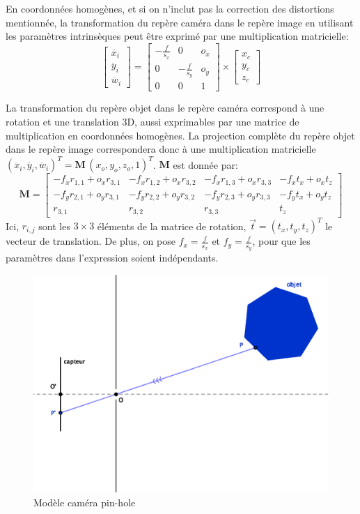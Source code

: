 \documentclass[a4paper,10pt]{scrreprt}
\begin{document}
En coordonnées homogènes, et si on n'inclut pas la correction des distortions mentionnée, la transformation du repère caméra dans le repère image en utilisant les paramètres intrinsèques peut être exprimé par une multiplication matricielle:
\begin{equation} \label{eq:cam_to_img}
	\begin{bmatrix}
		\ddot{x_i} \\
		\ddot{y_i} \\
		\ddot{w_i}
	\end{bmatrix} = \begin{bmatrix}
		-\frac{f}{s_x} & 0 & o_x \\
		0 & -\frac{f}{s_y} & o_y \\
		0 & 0 & 1
	\end{bmatrix} \times \begin{bmatrix}
		x_c \\
		y_c \\
		z_c
	\end{bmatrix}
\end{equation}

La transformation du repère objet dans le repère caméra correspond à une rotation et une translation 3D, aussi exprimables par une matrice de multiplication en coordonnées homogènes. La projection complète du repère objet dans le repère image correspondera donc à une multiplication matricielle $(\ddot{x_i}, \ddot{y_i}, \ddot{w_i})^T = \mathbf{M} \, (x_o, y_o, z_o, 1)^T$. $\mathbf{M}$ est donnée par:
\begin{equation*}
	\mathbf{M} = \begin{bmatrix}
		-f_x r_{1,1} + o_x r_{3,1} & -f_x r_{1,2} + o_x r_{3,2} & -f_x r_{1,3} + o_x r_{3,3} & -f_x t_x + o_x t_z \\
		-f_y r_{2,1} + o_y r_{3,1} & -f_y r_{2,2} + o_y r_{3,2} & -f_y r_{2,3} + o_y r_{3,3} & -f_y t_x + o_y t_z \\
		r_{3,1} & r_{3,2} & r_{3,3} & t_z
	\end{bmatrix}
\end{equation*}
Ici, $r_{i,j}$ sont les $3 \times 3$ éléments de la matrice de rotation, $\vec{t} = (t_x, t_y, t_z)^T$ le vecteur de translation. De plus, on pose $f_x = \frac{f}{s_x}$ et $f_y = \frac{f}{s_y}$, pour que les paramètres dans l'expression soient indépendants.

\begin{figure}[p]
\center
\includegraphics[width=.6\textwidth]{pinhole.eps}
\caption[Modèle caméra pin-hole]{Modèle caméra pin-hole}
\label{fig:pinhole}
\end{figure}
\end{document}
